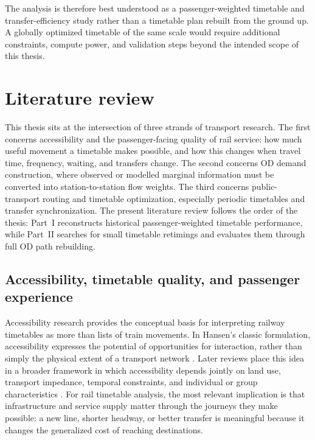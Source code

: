 \documentclass[preprint,12pt]{elsarticle}
\begin{document}
The analysis is therefore best understood as a passenger-weighted timetable and transfer-efficiency study rather than a timetable plan rebuilt from the ground up. A globally optimized timetable of the same scale would require additional constraints, compute power, and validation steps beyond the intended scope of this thesis.
\clearpage

\section{Literature review}\label{sec:litreview}

This thesis sits at the intersection of three strands of transport research. The first concerns accessibility and the passenger-facing quality of rail service: how much useful movement a timetable makes possible, and how this changes when travel time, frequency, waiting, and transfers change. The second concerns OD demand construction, where observed or modelled marginal information must be converted into station-to-station flow weights. The third concerns public-transport routing and timetable optimization, especially periodic timetables and transfer synchronization. The present literature review follows the order of the thesis: Part~I reconstructs historical passenger-weighted timetable performance, while Part~II searches for small timetable retimings and evaluates them through full OD path rebuilding.

\subsection{Accessibility, timetable quality, and passenger experience}\label{sec:reviewaccess}

Accessibility research provides the conceptual basis for interpreting railway timetables as more than lists of train movements. In Hansen's classic formulation, accessibility expresses the potential of opportunities for interaction, rather than simply the physical extent of a transport network \citep{hansen1959accessibility}. Later reviews place this idea in a broader framework in which accessibility depends jointly on land use, transport impedance, temporal constraints, and individual or group characteristics \citep{geurs2004accessibility}. For rail timetable analysis, the most relevant implication is that infrastructure and service supply matter through the journeys they make possible: a new line, shorter headway, or better transfer is meaningful because it changes the generalized cost of reaching destinations.
\end{document}
